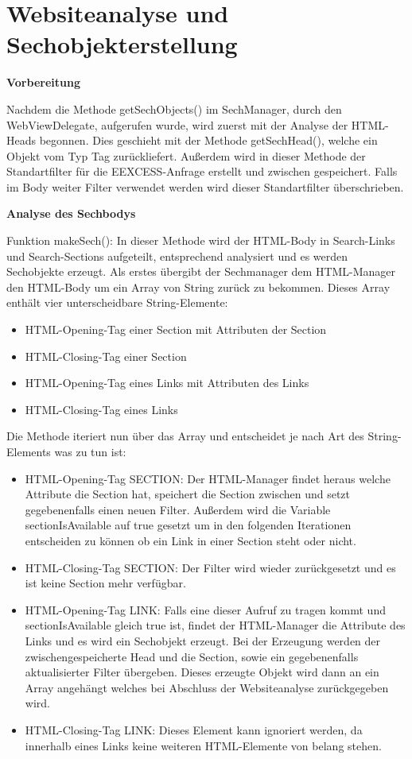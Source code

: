 \section{Websiteanalyse und Sechobjekterstellung}

\textbf{Vorbereitung}

Nachdem die Methode getSechObjects() im SechManager, durch den WebViewDelegate, aufgerufen wurde, wird zuerst mit der Analyse der HTML-Heads begonnen. Dies geschieht mit der Methode getSechHead(), welche ein Objekt vom Typ Tag zurückliefert. Außerdem wird in dieser Methode der Standartfilter für die EEXCESS-Anfrage erstellt und zwischen gespeichert. Falls im Body weiter Filter verwendet werden wird dieser Standartfilter überschrieben.

\textbf{Analyse des Sechbodys}

Funktion makeSech(): In dieser Methode wird der HTML-Body in Search-Links und Search-Sections aufgeteilt, entsprechend analysiert und es werden Sechobjekte erzeugt.
Als erstes übergibt der Sechmanager dem HTML-Manager den HTML-Body um ein Array von String zurück zu bekommen. Dieses Array enthält vier unterscheidbare String-Elemente:
\begin{itemize}
	\item HTML-Opening-Tag einer Section mit Attributen der Section
	\item HTML-Closing-Tag einer Section
	\item HTML-Opening-Tag eines Links mit Attributen des Links
	\item HTML-Closing-Tag eines Links
\end{itemize}

Die Methode iteriert nun über das Array und entscheidet je nach Art des String-Elements was zu tun ist:
\begin{itemize}
	\item HTML-Opening-Tag SECTION: Der HTML-Manager findet heraus welche Attribute die Section hat, speichert die Section zwischen und setzt gegebenenfalls einen neuen Filter. Außerdem wird die Variable sectionIsAvailable auf true gesetzt um in den folgenden Iterationen entscheiden zu können ob ein Link in einer Section steht oder nicht.
	\item HTML-Closing-Tag SECTION: Der Filter wird wieder zurückgesetzt und es ist keine Section mehr verfügbar.
	\item HTML-Opening-Tag LINK: Falls eine dieser Aufruf zu tragen kommt und sectionIsAvailable gleich true ist, findet der HTML-Manager die Attribute des Links und es wird ein Sechobjekt erzeugt. Bei der Erzeugung werden der zwischengespeicherte Head und die Section, sowie ein gegebenenfalls aktualisierter Filter übergeben. Dieses erzeugte Objekt wird dann an ein Array angehängt welches bei Abschluss der Websiteanalyse zurückgegeben wird.
	\item HTML-Closing-Tag LINK: Dieses Element kann ignoriert werden, da innerhalb eines Links keine weiteren HTML-Elemente von belang stehen.
\end{itemize}


